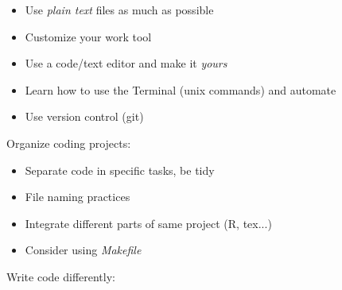 \documentclass[utf8, xcolor=dvipsnames, handout]{beamer}
\begin{document}
\begin{itemize}
  \item Use \textit{plain text} files as much as possible
  \item Customize your work tool
  \item Use a code/text editor and make it \textit{yours}
  \item Learn how to use the Terminal (unix commands) and automate
  \item Use version control (git)
\end{itemize}
\item Organize coding projects:
\begin{itemize}
  \item Separate code in specific tasks, be tidy
  \item File naming practices
  \item Integrate different parts of same project (R, tex...)
  \item Consider using \textit{Makefile}
\end{itemize}
\item Write code differently:
\end{document}
